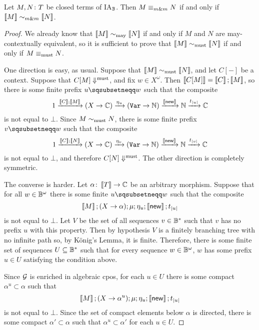 \documentclass[11pt]{report}
\begin{document}
\begin{theorem}
  Let $M,N\colon T$ be closed terms of IA${}_{\mathbb{B}}$.
  Then $M\mathrel{\equiv_{m\&m}} N$ if and only if $\left\llbracket M\right\rrbracket\mathrel{\sim_{m\&m}} \left\llbracket N\right\rrbracket$.
  \label{FullAbstractionFiniteNondeterminism}
\end{theorem}
\begin{proof}
  We already know that $\left\llbracket M\right\rrbracket\sim_{\operatorname{may}}\left\llbracket N\right\rrbracket$ if and only if $M$ and $N$ are may-contextually equivalent, so it is sufficient to prove that $\left\llbracket M\right\rrbracket\sim_{\operatorname{must}}\left\llbracket N\right\rrbracket$ if and only if $M\equiv_{\operatorname{must}}N$.

  One direction is easy, as usual.  
  Suppose that $\left\llbracket M\right\rrbracket\sim_{\operatorname{must}} \left\llbracket N\right\rrbracket$, and let $C[-]$ be a context.  
  Suppose that $C[M]\Downarrow^{\text{must}}$, and fix $w\in X^\omega$.
  Then $\left\llbracket C[M]\right\rrbracket = \left\llbracket C\right\rrbracket;\left\llbracket M\right\rrbracket$, so there is some finite prefix $u\pprefix w$ such that the composite
  \[
    1 \xrightarrow{\left\llbracket C\right\rrbracket;\left\llbracket M\right\rrbracket}
    (X \to \mathbb{C}) \xrightarrow{\eta_u}
    ({\mathtt{Var}} \to \mathbb{N}) \xrightarrow{\left\llbracket\operatorname{{\mathsf{new}}}\right\rrbracket}
    \mathbb{N} \xrightarrow{t_{|u|}}
    \mathbb{C}
    \]
  is not equal to $\bot$.  
  Since $M\sim_{\operatorname{must}} N$, there is some finite prefix $v\pprefix w$ such that the composite
  \[
    1 \xrightarrow{\left\llbracket C\right\rrbracket;\left\llbracket N\right\rrbracket}
    (X \to \mathbb{C}) \xrightarrow{\eta_v}
    ({\mathtt{Var}} \to \mathbb{N}) \xrightarrow{\left\llbracket\operatorname{{\mathsf{new}}}\right\rrbracket}
    \mathbb{N} \xrightarrow{t_{|v|}}
    \mathbb{C}
    \]
  is not equal to $\bot$, and therefore $C[N]\Downarrow^{\text{must}}$.  
  The other direction is completely symmetric.

  The converse is harder.  
  Let $\alpha \colon \left\llbracket T\right\rrbracket \to \mathbb{C}$ be an arbitrary morphism.
  Suppose that for all $w\in \mathbb{B}^\omega$ there is some finite $u\pprefix w$ such that the composite
  \[
    \left\llbracket M\right\rrbracket;(X \to \alpha);\mu;\eta_u;\left\llbracket\operatorname{{\mathsf{new}}}\right\rrbracket;t_{|u|}
    \]
  is not equal to $\bot$.  
  Let $V$ be the set of all sequences $v\in \mathbb{B}^*$ such that $v$ has no prefix $u$ with this property.  
  Then by hypothesis $V$ is a finitely branching tree with no infinite path so, by K\"{o}nig's Lemma, it is finite.  
  Therefore, there is some finite set of sequences $U\subseteq \mathbb{B}^*$ such that for every sequence $w\in \mathbb{B}^\omega$, $w$ has some prefix $u\in U$ satisfying the condition above.

  Since $\mathcal G$ is enriched in algebraic cpos, for each $u\in U$ there is some compact $\alpha^u\subset\alpha$ such that
  \[
    \left\llbracket M\right\rrbracket;(X \to \alpha^u);\mu;\eta_u;\left\llbracket\operatorname{{\mathsf{new}}}\right\rrbracket;t_{|u|}
    \]
  is not equal to $\bot$.  
  Since the set of compact elements below $\alpha$ is directed, there is some compact $\alpha'\subset\alpha$ such that $\alpha^u\subset\alpha'$ for each $u\in U$.  


\end{proof}
\end{document}

